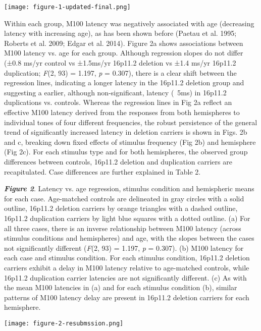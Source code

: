 \documentclass{article}
\begin{document}
\texttt{[image: figure-1-updated-final.png]}

\bigskip
Within each group, M100 latency was negatively associated with age (decreasing latency with increasing age), as has been shown before (Paetau et al. 1995; Roberts et al. 2009; Edgar et al. 2014). Figure 2a shows associations between M100 latency vs. age for each group. Although regression slopes do not differ (±0.8 ms/yr control vs ±1.5ms/yr 16p11.2 deletion vs ±1.4 ms/yr 16p11.2 duplication; \emph{F}(2, 93) = 1.197, \emph{p} = 0.307), there is a clear shift between the regression lines, indicating a longer latency in the 16p11.2 deletion group and suggesting a earlier, although non-significant, latency (~5ms) in 16p11.2 duplications vs. controls. Whereas the regression lines in Fig 2a reflect an effective M100 latency derived from the responses from both hemispheres to individual tones of four different frequencies, the robust persistence of the general trend of significantly increased latency in deletion carriers is shown in Figs. 2b and c, breaking down fixed effects of stimulus frequency (Fig 2b) and hemisphere (Fig 2c). For each stimulus type and for both hemispheres, the observed group differences between controls, 16p11.2 deletion and duplication carriers are recapitulated.  Case differences are further explained in Table 2. 

\bigskip

\textbf{\emph{Figure 2}}. Latency vs. age regression, stimulus condition and hemispheric means for each case. Age-matched controls are delineated in gray circles with a solid outline, 16p11.2 deletion carriers by orange triangles with a dashed outline, 16p11.2 duplication carriers by light blue squares with a dotted outline.  (a) For all three cases, there is an inverse relationship between M100 latency (across stimulus conditions and hemispheres) and age, with the slopes between the cases not significantly different (\emph{F}(2, 93) = 1.197, \emph{p} = 0.307). (b) M100 latency for each case and stimulus condition. For each stimulus condition, 16p11.2 deletion carriers exhibit a delay in M100 latency relative to age-matched controls, while 16p11.2 duplication carrier latencies are not significantly different. (c) As with the mean M100 latencies in (a) and for each stimulus condition (b), similar patterns of M100 latency delay are present in 16p11.2 deletion carriers for each hemisphere.

\begin{center}
\texttt{[image: figure-2-resubmssion.png]}
\end{center}
\end{document}
